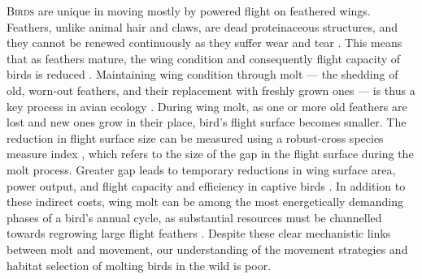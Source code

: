 
\newrefcontext[sorting=ynt]

\lettrine{B}{irds} are unique in moving mostly by powered flight on feathered wings.
Feathers, unlike animal hair and claws, are dead proteinaceous structures, and they cannot be renewed continuously as they suffer wear and tear \cite{rayner1988,jenni1989}.
This means that as feathers mature, the wing condition and consequently flight capacity of birds is reduced \cite{lindstrom1994,hedenstrom1999,hedenstrom2003}.
Maintaining wing condition through molt --- the shedding of old, worn-out feathers, and their replacement with freshly grown ones --- is thus a key process in avian ecology \cite{ginn1983,rayner1988}.
During wing molt, as one or more old feathers are lost and new ones grow in their place, bird's flight surface becomes smaller.
The reduction in flight surface size can be measured using a robust-cross species measure index \citep{lind2001,kiat2016}, which refers to the size of the gap in the flight surface during the molt process.
Greater gap leads to temporary reductions in wing surface area, power output, and flight capacity and efficiency in captive birds \cite{tucker1991,swaddle1996,swaddle1997,williams2003,lind2001,lind2001a,bowlin2009}.
In addition to these indirect costs, wing molt can be among the most energetically demanding phases of a bird's annual cycle, as substantial resources must be channelled towards regrowing large flight feathers \cite{lindstrom1993,newton2009,kiat2017}.
Despite these clear mechanistic links between molt and movement, our understanding of the movement strategies and habitat selection of molting birds in the wild is poor.

